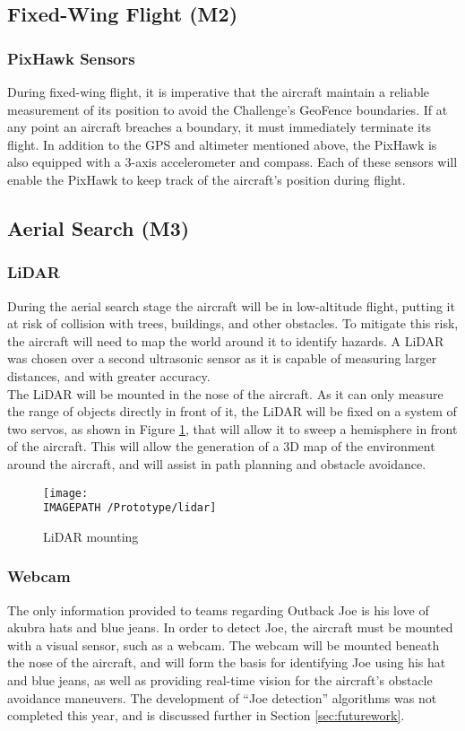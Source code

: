 \subsection{Fixed-Wing Flight (M2)}
\subsubsection*{PixHawk Sensors}
During fixed-wing flight, it is imperative that the aircraft maintain a reliable measurement of its position to avoid the Challenge's GeoFence boundaries. If at any point an aircraft breaches a boundary, it must immediately terminate its flight. In addition to the GPS and altimeter mentioned above, the PixHawk is also equipped with a 3-axis accelerometer and compass. Each of these sensors will enable the PixHawk to keep track of the aircraft's position during flight.

\subsection{Aerial Search (M3)}
\subsubsection*{LiDAR}
During the aerial search stage the aircraft will be in low-altitude flight, putting it at risk of collision with trees, buildings, and other obstacles. To mitigate this risk, the aircraft will need to map the world around it to identify hazards. A LiDAR was chosen over a second ultrasonic sensor as it is capable of measuring larger distances, and with greater accuracy.\\

The LiDAR will be mounted in the nose of the aircraft. As it can only measure the range of objects directly in front of it, the LiDAR will be fixed on a system of two servos, as shown in Figure \ref{fig:lidar}, that will allow it to sweep a hemisphere in front of the aircraft. This will allow the generation of a 3D map of the environment around the aircraft, and will assist in path planning and obstacle avoidance.

\begin{figure}[!ht]
	\centering
	\texttt{[image: \\IMAGEPATH /Prototype/lidar]}
	\caption{LiDAR mounting}
	\label{fig:lidar}
\end{figure}

\subsubsection*{Webcam}
The only information provided to teams regarding Outback Joe is his love of akubra hats and blue jeans. In order to detect Joe, the aircraft must be mounted with a visual sensor, such as a webcam. The webcam will be mounted beneath the nose of the aircraft, and will form the basis for identifying Joe using his hat and blue jeans, as well as providing real-time vision for the aircraft's obstacle avoidance maneuvers. The development of ``Joe detection'' algorithms was not completed this year, and is discussed further in Section \ref{sec:futurework}.

